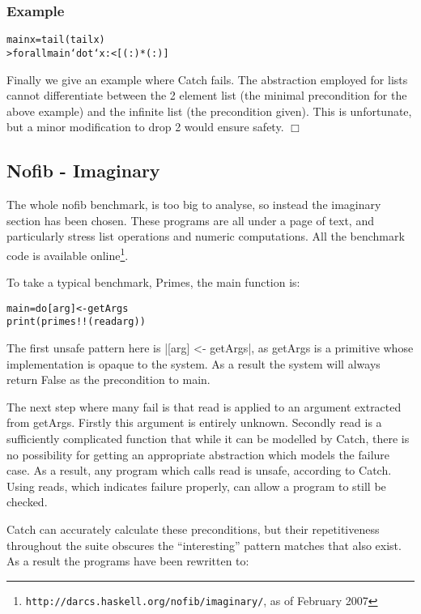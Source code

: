 \documentclass[preprint]{sigplanconf}
\newcommand{\C}[1]{\textsf{#1}}
\newcounter{exmp}
\newcommand{\yesexample}{\subsubsection*{Example \arabic{exmp}}\addtocounter{exmp}{1}}
\newcommand{\noexample}{\hfill$\Box$}
\newenvironment{code}{\begin{alltt}\small}{\end{alltt}}
\newenvironment{example}{\yesexample}{\noexample}
\begin{document}
\begin{example}
\begin{code}
main x = tail (tail x)
> forall main `dot` x :< [ (:) * (:) ]
\end{code}

Finally we give an example where Catch fails. The abstraction employed for lists cannot differentiate between the 2 element list (the minimal precondition for the above example) and the infinite list (the precondition given). This is unfortunate, but a minor modification to \C{drop 2} would ensure safety.
\end{example}

\subsection{Nofib - Imaginary}

The whole nofib benchmark, is too big to analyse, so instead the imaginary section has been chosen. These programs are all under a page of text, and particularly stress list operations and numeric computations. All the benchmark code is available online\footnote{\texttt{http://darcs.haskell.org/nofib/imaginary/}, as of February 2007}.

To take a typical benchmark, Primes, the \C{main} function is:

\begin{code}
main = do  [arg] <- getArgs
           print (primes !! (read arg))
\end{code}

The first unsafe pattern here is |[arg] <- getArgs|, as \C{getArgs} is a primitive whose implementation is opaque to the system. As a result the system will always return False as the precondition to main.

The next step where many fail is that \C{read} is applied to an argument extracted from getArgs. Firstly this argument is entirely unknown. Secondly \C{read} is a sufficiently complicated function that while it can be modelled by Catch, there is no possibility for getting an appropriate abstraction which models the failure case. As a result, any program which calls \C{read} is unsafe, according to Catch. Using \C{reads}, which indicates failure properly, can allow a program to still be checked.

Catch can accurately calculate these preconditions, but their repetitiveness throughout the suite obscures the ``interesting'' pattern matches that also exist. As a result the programs have been rewritten to:
\end{document}

